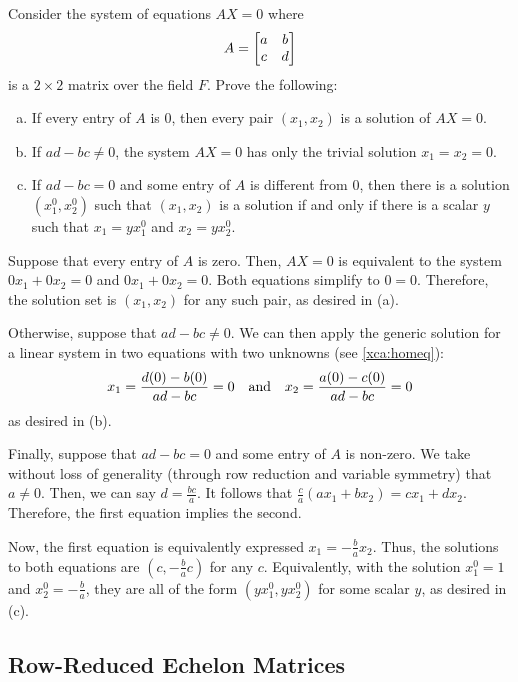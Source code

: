 \begin{xca}
  Consider the system of equations $AX = 0$ where \[ A = \mqty[a&b \\ c&d] \]
  is a $2 \times 2$ matrix over the field $F$. Prove the following:
  \setlength\parskip{0pt}
  \begin{enumerate}[(a)]
    \item If every entry of $A$ is 0, then every pair $(x_1, x_2)$ is a solution of $AX = 0$.
    \item If $ad-bc \neq 0$, the system $AX = 0$ has only the trivial solution $x_1 = x_2 = 0$.
    \item If $ad-bc = 0$ and some entry of $A$ is different from 0,
          then there is a solution $(x_1^0, x_2^0)$ such that
          $(x_1, x_2)$ is a solution if and only if there is a scalar $y$ such that
          $x_1 = yx_1^0$ and $x_2 = yx_2^0$.
  \end{enumerate}
\end{xca}
\begin{prf}
  Suppose that every entry of $A$ is zero.
  Then, $AX = 0$ is equivalent to the system $0x_1 + 0x_2 = 0$ and $0x_1 + 0x_2 = 0$.
  Both equations simplify to $0 = 0$.
  Therefore, the solution set is $(x_1, x_2)$ for any such pair, as desired in (a).

  Otherwise, suppose that $ad - bc \neq 0$.
  We can then apply the generic solution for a linear system in two equations with two unknowns
  (see \cref{xca:homeq}):
  \[ x_1 = \frac{d(0) - b(0)}{ad - bc} = 0 \qq{and} x_2 = \frac{a(0) - c(0)}{ad - bc} = 0 \]
  as desired in (b).

  Finally, suppose that $ad - bc = 0$ and some entry of $A$ is non-zero.
  We take without loss of generality (through row reduction and variable symmetry) that $a \neq 0$.
  Then, we can say $d = \frac{bc}{a}$.
  It follows that $\frac{c}{a}(ax_1 + bx_2) = cx_1 + dx_2$.
  Therefore, the first equation implies the second.

  Now, the first equation is equivalently expressed $x_1 = -\frac{b}{a}x_2$.
  Thus, the solutions to both equations are $(c, -\frac{b}{a}c)$ for any $c$.
  Equivalently, with the solution $x_1^0 = 1$ and $x_2^0 = -\frac{b}{a}$,
  they are all of the form $(yx_1^0, yx_2^0)$ for some scalar $y$, as desired in (c).
\end{prf}

\subsection{Row-Reduced Echelon Matrices}

